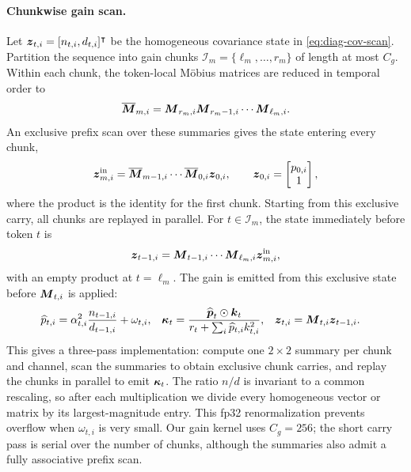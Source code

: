 \documentclass{article} %
\begin{document}
\paragraph{Chunkwise gain scan.}
Let $\boldsymbol{z}_{t,i}=[n_{t,i},d_{t,i}]^{\intercal}$ be the homogeneous covariance state in
\eqref{eq:diag-cov-scan}. Partition the sequence
into gain chunks $\mathcal{I}_m=\{\ell_m,\ldots,r_m\}$ of length at most $C_g$. Within each chunk,
the token-local M\"obius matrices are reduced in temporal order to
\begin{equation}
  \overline{\boldsymbol{M}}_{m,i}
  =\boldsymbol{M}_{r_m,i}\boldsymbol{M}_{r_m-1,i}\cdots\boldsymbol{M}_{\ell_m,i}.
  \label{eq:chunk-gain-summary}
\end{equation}
An exclusive prefix scan over these summaries gives the state entering every chunk,
\begin{equation}
  \boldsymbol{z}^{\mathrm{in}}_{m,i}
  =\overline{\boldsymbol{M}}_{m-1,i}\cdots\overline{\boldsymbol{M}}_{0,i}\boldsymbol{z}_{0,i},
  \qquad
  \boldsymbol{z}_{0,i}=\begin{bmatrix}p_{0,i}\\1\end{bmatrix},
  \label{eq:chunk-gain-carry}
\end{equation}
where the product is the identity for the first chunk. Starting from this exclusive carry, all
chunks are replayed in parallel. For $t\in\mathcal{I}_m$, the state immediately before token $t$
is
\begin{equation}
  \boldsymbol{z}_{t-1,i}
  =\boldsymbol{M}_{t-1,i}\cdots\boldsymbol{M}_{\ell_m,i}\boldsymbol{z}^{\mathrm{in}}_{m,i},
  \label{eq:chunk-gain-local-prefix}
\end{equation}
with an empty product at $t=\ell_m$. The gain is emitted from this exclusive state before
$\boldsymbol{M}_{t,i}$ is applied:
\begin{equation}
\begin{aligned}
  \widehat p_{t,i}
  &=\alpha_{t,i}^2\frac{n_{t-1,i}}{d_{t-1,i}}+\omega_{t,i},
  &
  \boldsymbol{\kappa}_t
  &=\frac{\widehat{\boldsymbol{p}}_t\odot\boldsymbol{k}_t}
  {r_t+\sum_i\widehat p_{t,i}k_{t,i}^2},
  &
  \boldsymbol{z}_{t,i}&=\boldsymbol{M}_{t,i}\boldsymbol{z}_{t-1,i}.
\end{aligned}
  \label{eq:chunk-gain-emission}
\end{equation}
This gives a three-pass implementation: compute one $2\times2$ summary per chunk and channel,
scan the summaries to obtain exclusive chunk carries, and replay the chunks in parallel to emit
$\boldsymbol{\kappa}_t$. The ratio $n/d$ is invariant to a common rescaling, so after each multiplication
we divide every homogeneous vector or matrix by its largest-magnitude entry. This fp32
renormalization prevents overflow when $\omega_{t,i}$ is very small. Our gain kernel uses
$C_g=256$; the short carry pass is serial over the number of chunks, although the summaries also
admit a fully associative prefix scan.
\end{document}
